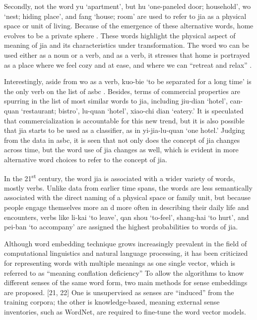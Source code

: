 Secondly, not the word yu `apartment', but hu `one-paneled door; household', wo `nest; hiding place', and fang `house; room' are used to refer to jia as a physical space or unit of living. Because of the emergence of these alternative words, home evolves to be a private sphere \parencite{mallett2004understanding}. These words highlight the physical aspect of meaning of jia and its characteristics under transformation. The word wo can be used either as a noun or a verb, and as a verb, it stresses that home is portrayed as a place where we feel cozy and at ease, and where we can ``retreat and relax'' \parencite{mallett2004understanding}. 

Interestingly, aside from wo as a verb, kuo-bie `to be separated for a long time' is the only verb on the list of \gls{asbc}  \parencite{mallett2004understanding,samanani2019house}. Besides, terms of commercial properties are spurring in the list of most similar words to jia, including jiu-dian `hotel', can-quan `restaurant; bistro', lu-quan `hotel', xiao-chi dian `eatery.' It is speculated that commercialization is accountable for this new trend, but it is also possible that jia starts to be used as a classifier, as in yi-jia-lu-quan `one hotel.' Judging from the data in \gls{asbc}, it is seen that not only does the concept of jia changes across time, but the word use of jia changes as well, which is evident in more alternative word choices to refer to the concept of jia. 

In the 21\textsuperscript{st} century, the word jia is associated with a wider variety of words, mostly verbs. Unlike data from earlier time spans, the words are less semantically associated with the direct naming of a physical space or family unit, but because people engage themselves more an d more often in describing their daily life and encounters, verbs like li-kai `to leave', qan shou `to-feel', shang-hai `to hurt', and pei-ban `to accompany' are assigned the highest probabilities to words of jia. 

Although word embedding technique grows increasingly prevalent in the field of computational linguistics and natural language processing, it has been criticized for representing words with multiple meanings as one single vector, which is referred to as ``meaning conflation deficiency'' \parencite{camacho2018survey} To allow the algorithms to know different senses of the same word form, two main methods for sense embeddings are proposed. [21, 22] One is unsupervised as senses are ``induced'' from the training corpora; the other is knowledge-based, meaning external sense inventories, such as WordNet, are required to fine-tune the word vector models. 

